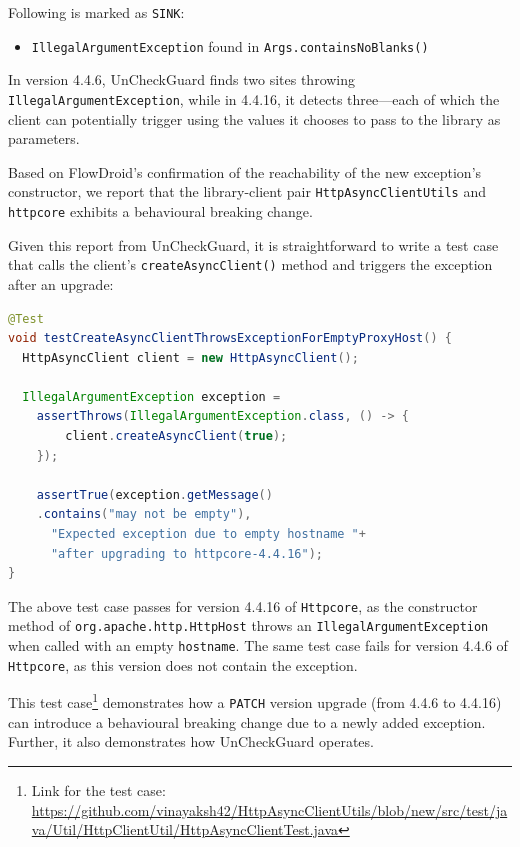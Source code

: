 Following is marked as \texttt{SINK}:
\begin{itemize}
  \item \texttt{IllegalArgumentException} found in \texttt{Args.containsNoBlanks()}
\end{itemize}

In version 4.4.6, UnCheckGuard finds two sites throwing \texttt{IllegalArgumentException}, while in 4.4.16, it detects three—each of which the client can potentially trigger using the values it chooses to pass to the library as parameters.

Based on FlowDroid's confirmation of the reachability of the new exception's constructor, we report that the library-client pair \texttt{HttpAsyncClientUtils} and \texttt{httpcore} exhibits a behavioural breaking change.

Given this report from UnCheckGuard, it is straightforward to write a test case that calls the client's \texttt{createAsyncClient()} method
and triggers the exception after an upgrade:
\begin{lstlisting}[language=Java]
@Test
void testCreateAsyncClientThrowsExceptionForEmptyProxyHost() {
  HttpAsyncClient client = new HttpAsyncClient();

  IllegalArgumentException exception =
    assertThrows(IllegalArgumentException.class, () -> {
        client.createAsyncClient(true);
    });

    assertTrue(exception.getMessage()
    .contains("may not be empty"),
      "Expected exception due to empty hostname "+
      "after upgrading to httpcore-4.4.16");
}
\end{lstlisting}

The above test case passes for version 4.4.16 of \texttt{Httpcore}, as the constructor method of \texttt{org.apache.http.HttpHost} throws an \texttt{IllegalArgumentException} when called with an empty \texttt{hostname}. The same test case fails for version 4.4.6 of \texttt{Httpcore}, as this version does not contain the exception.

This test case\footnote{Link for the test case: \url{https://github.com/vinayaksh42/HttpAsyncClientUtils/blob/new/src/test/java/Util/HttpClientUtil/HttpAsyncClientTest.java}} demonstrates how a \texttt{PATCH} version upgrade (from 4.4.6 to 4.4.16) can introduce a behavioural breaking change due to a newly added exception. Further, it also demonstrates how UnCheckGuard operates.